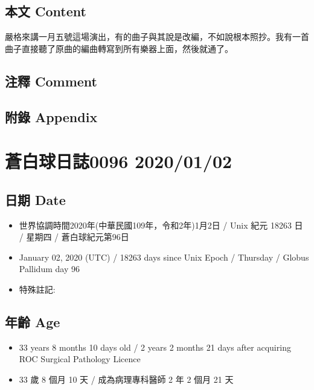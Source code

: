 \documentclass[a5paper, 12pt
]{book}
\providecommand{\tightlist}{%
  \setlength{\itemsep}{0pt}\setlength{\parskip}{0pt}}
\begin{document}
\hypertarget{ux672cux6587-content-31}{%
\subsection{本文 Content}\label{ux672cux6587-content-31}}

嚴格來講一月五號這場演出，有的曲子與其說是改編，不如說根本照抄。我有一首曲子直接聽了原曲的編曲轉寫到所有樂器上面，然後就通了。

\hypertarget{ux6ce8ux91cb-comment-30}{%
\subsection{注釋 Comment}\label{ux6ce8ux91cb-comment-30}}

\hypertarget{ux9644ux9304-appendix-31}{%
\subsection{附錄 Appendix}\label{ux9644ux9304-appendix-31}}

\hypertarget{ux84bcux767dux7403ux65e5ux8a8c0096-20200102}{%
\section{蒼白球日誌0096
2020/01/02}\label{ux84bcux767dux7403ux65e5ux8a8c0096-20200102}}

\hypertarget{ux65e5ux671f-date-32}{%
\subsection{日期 Date}\label{ux65e5ux671f-date-32}}

\begin{itemize}
\tightlist
\item
  世界協調時間2020年(中華民國109年，令和2年)1月2日 / Unix 紀元 18263 日
  / 星期四 / 蒼白球紀元第96日
\item
  January 02, 2020 (UTC) / 18263 days since Unix Epoch / Thursday /
  Globus Pallidum day 96
\item
  特殊註記:
\end{itemize}

\hypertarget{ux5e74ux9f61-age-32}{%
\subsection{年齡 Age}\label{ux5e74ux9f61-age-32}}

\begin{itemize}
\tightlist
\item
  33 years 8 months 10 days old / 2 years 2 months 21 days after
  acquiring ROC Surgical Pathology Licence
\item
  33 歲 8 個月 10 天 / 成為病理專科醫師 2 年 2 個月 21 天
\end{itemize}
\end{document}
